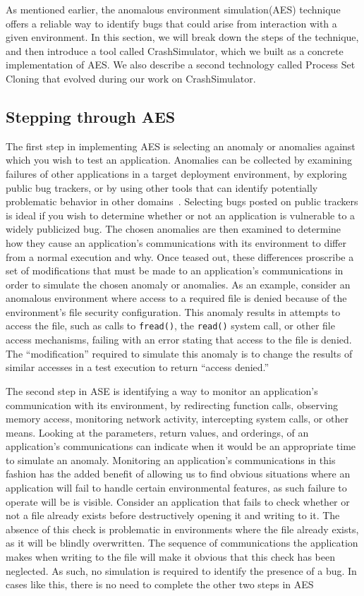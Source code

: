 As mentioned earlier,
the anomalous environment simulation(AES) technique
offers a reliable way to identify bugs
that could arise from interaction with a given environment.
In this section,
we will break down the steps of the technique,
and then introduce a tool called CrashSimulator,
which we built as a concrete implementation of AES.
We also describe a second technology
called Process Set Cloning
that evolved during our work on CrashSimulator.


\subsection{Stepping through AES}

The first step in implementing AES
is selecting an anomaly or anomalies
against which you wish to test an application.
Anomalies can be collected
by examining failures of other applications
in a target deployment environment,
by exploring public bug trackers,
or by using other tools that can identify
potentially problematic behavior in other domains~\cite{Zhuang_NSDI_2014,
rasley2015detecting}.
Selecting bugs posted on public trackers
is ideal if you wish to determine
whether or not an application
is vulnerable to a widely publicized bug.
The chosen anomalies are then examined
to determine how they cause an application's communications
with its environment
to differ from a normal execution and why.
Once teased out,
these differences proscribe
a set of modifications
that must be made to an application's communications
in order to simulate the chosen anomaly or anomalies.
As an example,
consider an anomalous environment
where access to a required file is denied because of
the environment's file security configuration.
This anomaly results in attempts to access the file,
such as calls to {\tt fread()},
the {\tt read()} system call,
or other file access mechanisms,
failing with an error stating that access to the file is denied.
The ``modification'' required to simulate this anomaly
is to change the results of similar accesses
in a test execution
to return ``access denied.''

The second step in ASE
is identifying
a way to monitor an application's communication
with its environment,
by redirecting function calls,
observing memory access,
monitoring network activity,
intercepting system calls,
or other means.
Looking at the parameters,
return values,
and orderings,
of an application's communications
can indicate
when it would be an appropriate time to simulate an anomaly.
Monitoring an application's communications
in this fashion
has the added benefit
of allowing us to find obvious situations
where an application will fail
to handle certain environmental features,
as such failure to operate will be
is visible.
Consider an application that fails to check whether or not
a file already exists
before destructively opening it and writing to it.
The absence of this check
is problematic in environments where the file already exists,
as it will be blindly overwritten.
The sequence of communications
the application makes when writing to the file
will make it obvious that this check has been neglected.
As such,
no simulation is required to identify the presence of a bug.
In cases like this,
there is no need to complete the other two steps in AES

